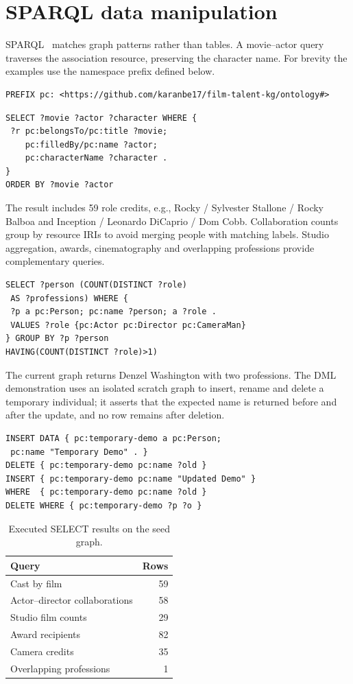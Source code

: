 \documentclass[sigconf,nonacm]{acmart}
\begin{document}
\section{SPARQL data manipulation}
SPARQL~\cite{sparql,update} matches graph patterns rather than tables. A movie--actor query traverses the association resource, preserving the character name. For brevity the examples use the namespace prefix defined below.
\begin{lstlisting}
PREFIX pc: <https://github.com/karanbe17/film-talent-kg/ontology#>
\end{lstlisting}
\begin{lstlisting}
SELECT ?movie ?actor ?character WHERE {
 ?r pc:belongsTo/pc:title ?movie;
    pc:filledBy/pc:name ?actor;
    pc:characterName ?character .
}
ORDER BY ?movie ?actor
\end{lstlisting}
The result includes 59 role credits, e.g., Rocky / Sylvester Stallone / Rocky Balboa and Inception / Leonardo DiCaprio / Dom Cobb. Collaboration counts group by resource IRIs to avoid merging people with matching labels. Studio aggregation, awards, cinematography and overlapping professions provide complementary queries.
\begin{lstlisting}
SELECT ?person (COUNT(DISTINCT ?role)
 AS ?professions) WHERE {
 ?p a pc:Person; pc:name ?person; a ?role .
 VALUES ?role {pc:Actor pc:Director pc:CameraMan}
} GROUP BY ?p ?person
HAVING(COUNT(DISTINCT ?role)>1)
\end{lstlisting}
The current graph returns Denzel Washington with two professions. The DML demonstration uses an isolated scratch graph to insert, rename and delete a temporary individual; it asserts that the expected name is returned before and after the update, and no row remains after deletion.
\begin{lstlisting}
INSERT DATA { pc:temporary-demo a pc:Person;
 pc:name "Temporary Demo" . }
DELETE { pc:temporary-demo pc:name ?old }
INSERT { pc:temporary-demo pc:name "Updated Demo" }
WHERE  { pc:temporary-demo pc:name ?old }
DELETE WHERE { pc:temporary-demo ?p ?o }
\end{lstlisting}
\begin{table}[h]
\caption{Executed SELECT results on the seed graph.}\label{tab:results}
\small\begin{tabular}{@{}lr@{}}\toprule
Query & Rows\\\midrule
Cast by film & 59\\
Actor--director collaborations & 58\\
Studio film counts & 29\\
Award recipients & 82\\
Camera credits & 35\\
Overlapping professions & 1\\\bottomrule\end{tabular}
\end{table}
\end{document}
